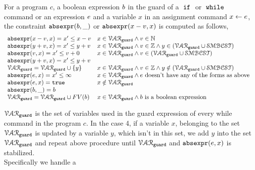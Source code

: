 \begin{defn}
  \label{def:constraint_compute}
  For a program $c$, a boolean expression $b$ in the guard of a $\;\mathtt{if}\;$ or $\;\mathtt{while}\;$ command
  or an expression $e$ and a variable $x$
  in an assignment command $\mathrel{ x \leftarrow e }$,
  the constraint $\mathtt{abs}{\mathtt{expr}}(b, \_)$ or $\mathtt{abs}{\mathtt{expr}}(x - v, x)$ is computed as follows,
  \[
    \begin{array}{ll} 
      \mathtt{abs}{\mathtt{expr}}(x - v, x)  = x' \leq x - v  & x \in \mathcal{VAR}_{\mathtt{guard}} \land v \in \mathbb{N} \\
      \mathtt{abs}{\mathtt{expr}}(y + v, x)  = x' \leq y + v  & x \in \mathcal{VAR}_{\mathtt{guard}} \land v \in \mathbb{Z} \land y \in (\mathcal{VAR}_{\mathtt{guard}} \cup \mathcal{SMBCST}) \\
      \mathtt{abs}{\mathtt{expr}}(v, x)  = x' \leq v + 0  & x \in \mathcal{VAR}_{\mathtt{guard}} \land v \in (\mathcal{VAR}_{\mathtt{guard}} \cup \mathcal{SMBCST}) \\
      \mathtt{abs}{\mathtt{expr}}(y + v, x)  = x' \leq y + v & \\
      \mathcal{VAR}_{\mathtt{guard}} = \mathcal{VAR}_{\mathtt{guard}} \cup \{y\} & x \in \mathcal{VAR}_{\mathtt{guard}} \land v \in \mathbb{Z} \land y \notin (\mathcal{VAR}_{\mathtt{guard}} \cup \mathcal{SMBCST})  \\
      \mathtt{abs}{\mathtt{expr}}(e, x) = x' \leq \infty  &  x \in \mathcal{VAR}_{\mathtt{guard}} \land e \text{ doesn't have any of the forms as above} \\
      \mathtt{abs}{\mathtt{expr}}(e, x) = \mathtt{true}  &  x \notin \mathcal{VAR}_{\mathtt{guard}} \\
      \mathtt{abs}{\mathtt{expr}}(b, \_) = b   & \\
      \mathcal{VAR}_{\mathtt{guard}} = \mathcal{VAR}_{\mathtt{guard}} \cup FV(b) &  x \in \mathcal{VAR}_{\mathtt{guard}} \land b \text{ is a boolean expression} \\
    \end{array}
    \]
  \end{defn}
%
  $\mathcal{VAR}_{\mathtt{guard}}$ is the set of variables used in the guard expression of every while command in the program $c$. 
  In the case 4, if a variable $x$, belonging to the set 
  $\mathcal{VAR}_{\mathtt{guard}}$ is updated by a variable $y$, which isn't in this set, 
  we add $y$ into the set $\mathcal{VAR}_{\mathtt{guard}}$ and repeat 
  above procedure  until $\mathcal{VAR}_{\mathtt{guard}}$ and $\mathtt{abs}{\mathtt{expr}}(e, x)$ is stabilized. 
  \\
Specifically 
we handle a 
